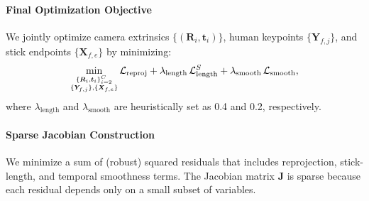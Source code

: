 \documentclass[a4paper, 10pt, conference]{ieeeconf}      %
\newcommand{\vect}[1]{\bm{#1}}
\newcommand{\mat}[1]{\bm{#1}}
\begin{document}
\paragraph{Final Optimization Objective}
We jointly optimize camera extrinsics $\{(\mat{R}_i, \vect{t}_i)\}$, human keypoints $\{\vect{Y}_{f,j}\}$, and stick endpoints $\{\vect{X}_{f,e}\}$ by minimizing:
\begin{equation} \footnotesize
\label{eq:ba3_endpoints}
\min_{\substack{\{\mat{R}_i,\vect{t}_i\}_{i=2}^C\\ \{\vect{Y}_{f,j}\},\{\vect{X}_{f,e}\}}}
\mathcal{L}_{\text{reproj}}
+ \lambda_{\text{length}}\,\mathcal{L}_{\text{length}}^{S}
+ \lambda_{\text{smooth}}\,\mathcal{L}_{\text{smooth}}, 
\end{equation}
where $\lambda_{\text{length}}$ and $\lambda_{\text{smooth}}$ are heuristically set as 0.4 and 0.2, respectively.



\paragraph{Sparse Jacobian Construction}
We minimize a sum of (robust) squared residuals that includes reprojection, stick-length, and temporal smoothness terms. The Jacobian matrix $\mat{J}$ is sparse because each residual depends only on a small subset of variables.
\end{document}
